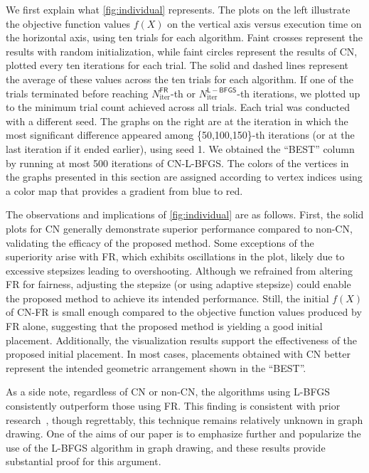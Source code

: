 \documentclass[dvipdfmx,10pt,journal,compsoc]{IEEEtran}
\begin{document}
We first explain what \cref{fig:individual} represents.
The plots on the left illustrate the objective function values $f(X)$ on the vertical axis versus execution time on the horizontal axis, using ten trials for each algorithm.
Faint crosses represent the results with random initialization, while faint circles represent the results of \textsf{CN}, plotted every ten iterations for each trial.
The solid and dashed lines represent the average of these values across the ten trials for each algorithm.
If one of the trials terminated before reaching $N_\mathrm{iter}^\mathsf{FR}$-th or $N_\mathrm{iter}^\mathsf{L-BFGS}$-th iterations, we plotted up to the minimum trial count achieved across all trials. Each trial was conducted with a different seed.
The graphs on the right are at the iteration in which the most significant difference appeared among \{50,100,150\}-th iterations (or at the last iteration if it ended earlier), using seed 1. We obtained the ``BEST'' column by running at most 500 iterations of \textsf{CN-L-BFGS}.
The colors of the vertices in the graphs presented in this section are assigned according to vertex indices using a color map that provides a gradient from blue to red.

The observations and implications of \cref{fig:individual} are as follows.
First, the solid plots for \textsf{CN} generally demonstrate superior performance compared to non-\textsf{CN}, validating the efficacy of the proposed method.
Some exceptions of the superiority arise with \textsf{FR}, which exhibits oscillations in the plot, likely due to excessive stepsizes leading to overshooting.
Although we refrained from altering \textsf{FR} for fairness, adjusting the stepsize (or using adaptive stepsize) could enable the proposed method to achieve its intended performance.
Still, the initial $f(X)$ of \textsf{CN-FR} is small enough compared to the objective function values produced by \textsf{FR} alone, suggesting that the proposed method is yielding a good initial placement.
Additionally, the visualization results support the effectiveness of the proposed initial placement. In most cases, placements obtained with \textsf{CN} better represent the intended geometric arrangement shown in the ``BEST''.

As a side note, regardless of \textsf{CN} or non-\textsf{CN}, the algorithms using \textsf{L-BFGS} consistently outperform those using \textsf{FR}.
This finding is consistent with prior research~\cite{6183577}, though regrettably, this technique remains relatively unknown in graph drawing.
One of the aims of our paper is to emphasize further and popularize the use of the L-BFGS algorithm in graph drawing, and these results provide substantial proof for this argument.
\end{document}
